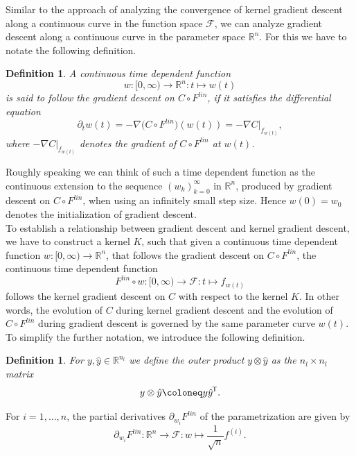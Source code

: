 \documentclass[11pt, a4paper]{article}
\newtheorem{definition}[theorem]{Definition}
\newcommand{\R}{\mathbb{R}}
\newcommand{\F}{\mathcal{F}}
\newcommand*{\tr}{^{\mkern-1.5mu\mathsf{T}}}
\begin{document}
Similar to the approach of analyzing the convergence of kernel gradient descent along a continuous curve in the function space $\F$, we can analyze gradient descent along a continuous curve in the parameter space $\R^n$. For this we have to notate the following definition.

\begin{definition} \label{def:follow}
A continuous time dependent function 
\[ w : [0,\infty) \to \R^n : t \mapsto w(t) \] 
is said to follow the gradient descent on $C \circ F^\textit{lin}$, if it satisfies the differential equation
\[ \partial_tw(t) = - \nabla \big (C \circ F^\textit{lin} \big ) (w(t)) = - \nabla C|_{f_{w(t)}}, \]
where $- \nabla C|_{f_{w(t)}}$ denotes the gradient of $C \circ F^\textit{lin}$ at $w(t)$.
\end{definition}

Roughly speaking we can think of such a time dependent function as the continuous extension to the sequence $(w_k)_{k=0}^\infty$ in $\R^n$, produced by gradient descent on $C \circ F^\textit{lin}$, when using an infinitely small step size. Hence $w(0) = w_0$ denotes the initialization of gradient descent. \\

To establish a relationship between gradient descent and kernel gradient descent, we have to construct a kernel $K$, such that given a continuous time dependent function $w: [0, \infty) \to \R^n$, that follows the gradient descent on $C \circ F^\textit{lin}$, the continuous time dependent function
\[ F^\textit{lin} \circ w : [0, \infty) \to \F : t \mapsto f_{w(t)} \]
follows the kernel gradient descent on $C$ with respect to the kernel $K$. In other words, the evolution of $C$ during kernel gradient descent and the evolution of $C \circ F^\textit{lin}$ during gradient descent is governed by the same parameter curve $w(t)$. \\

To simplify the further notation, we introduce the following definition.

\begin{definition}
For $y, \hat{y} \in \R^{n_l}$ we define the outer product $y \otimes \hat{y}$ as the $n_l \times n_l$ matrix
\[ y \otimes \hat{y} \coloneq y \hat{y} \tr. \]
\end{definition}

For $i=1,\dots,n$, the partial derivatives $\partial_{w_{i}}F^\textit{lin}$ of the parametrization are given by
\[ \partial_{w_{i}}F^\textit{lin} : \R^n \to \F: w \mapsto \frac{1}{\sqrt{n}}f^{(i)}. \]
\end{document}
